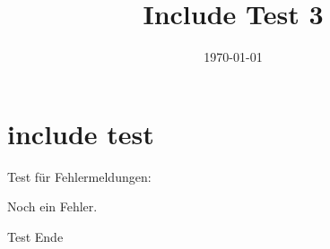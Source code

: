 \documentclass[12pt, english, a4paper]{article}
\begin{document}
\title{Include Test 3}
\date{\today}
\maketitle

\section{include test}

Test für Fehlermeldungen:



Noch ein Fehler.



    Test Ende
\end{document}
